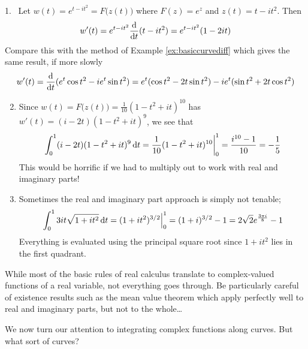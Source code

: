 \begin{examples}{}{}
\hangindent\leftmargini
\textup{1.} \ Let $w(t)=e^{t-it^2}=F\bigl(z(t)\bigr)$ where $F(z)=e^z$ and $z(t)=t-it^2$. Then
\[w'(t)=e^{t-it^2}\frac{\mathrm{d} }{\mathrm{d} t}(t-it^2)=e^{t-it^2}(1-2it)\]
Compare this with the method of Example \ref{ex:basiccurvediff} which gives the same result, if more slowly
\[w'(t)=\frac{\mathrm{d} }{\mathrm{d} t}(e^t\cos t^2-ie^t\sin t^2)=e^t(\cos t^2-2t\sin t^2)-ie^t(\sin t^2+2t\cos t^2)\]
\begin{enumerate}\setcounter{enumi}{1}
	\item Since $w(t)=F\bigl(z(t)\bigr)=\frac 1{10}(1-t^2+it)^{10}$ has $w'(t)=(i-2t)(1-t^2+it)^9$, we see that
	\[\int_0^1(i-2t)(1-t^2+it)^9\,{\mathrm{d} t} =\frac 1{10}(1-t^2+it)^{10}\bigg|_0^1 =\frac{i^{10}-1}{10}=-\frac 15\]
	This would be horrific if we had to multiply out to work with real and imaginary parts!
	\item Sometimes the real and imaginary part approach is simply not tenable;
	\[\int_0^1 3it\sqrt{1+it^2}\,{\mathrm{d} t}=(1+it^2)^{3/2}\Big|_0^1=(1+i)^{3/2}-1 =2\sqrt 2e^{\frac{3\pi i}{8}}-1\]
	Everything is evaluated using the principal square root since $1+it^2$ lies in the first quadrant.
\end{enumerate}
\end{examples}
\goodbreak

While most of the basic rules of real calculus translate to complex-valued functions of a real variable, not everything goes through. Be particularly careful of existence results such as the mean value theorem which apply perfectly well to real and imaginary parts, but not to the whole\ldots
\goodbreak



We now turn our attention to integrating complex functions along curves. But what sort of curves?

